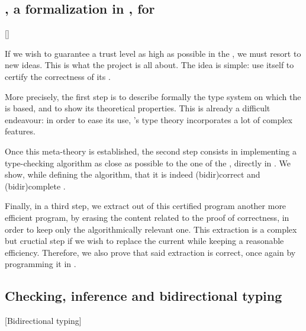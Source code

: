 \subsection{, a formalization in , for }[]
\label{sec:intro-metacoq-fr}

If we wish to guarantee a trust level as high as possible in the , we must
resort to new ideas. This is what the  project is all about. The idea
is simple: use  itself to certify the correctness of its .

More precisely, the first step is to describe formally the type system on which the 
is based, and to show its theoretical properties.
This is already a difficult endeavour: in order to ease its use, ’s type theory
incorporates a lot of complex features.

Once this meta-theory is established, the second step
consists in implementing a type-checking algorithm as close as possible to the one of the
, directly in %
.
We show, while defining the algorithm, that it is indeed \reintro(bidir){correct}%
and \reintro(bidir){complete}%
.

Finally, in a third step, we extract out of this certified  program another
more efficient program, by erasing the content related to the proof of correctness, in order
to keep only the algorithmically relevant one.
This extraction is a complex but cructial step if we wish to replace the current 
while keeping a reasonable efficiency. Therefore, we also prove that said extraction
is correct,%
once again by programming it in .

\subsection{Checking, inference and bidirectional typing}[Bidirectional typing]

